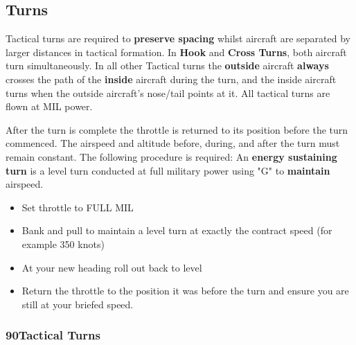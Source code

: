 \newpage

\subsection{Turns}

Tactical turns are required to \textbf{preserve spacing} whilst aircraft are
separated by larger distances in tactical formation. In \textbf{Hook} and
\textbf{Cross Turns}, both aircraft turn simultaneously. In all other Tactical
turns the \textbf{outside} aircraft \textbf{always} crosses the path of the
\textbf{inside} aircraft during the turn, and the inside aircraft turns when
the outside aircraft's nose/tail points at it. All tactical turns are flown at
MIL power.

After the turn is complete the throttle is returned to its position before the
turn commenced. The airspeed and altitude before, during, and after the turn
must remain constant. The following procedure is required: An \textbf{energy
sustaining turn} is a level turn conducted at full military power using "G" to
\textbf{maintain} airspeed.

\begin{itemize}

  \item Set throttle to FULL MIL

  \item Bank and pull to maintain a level turn at exactly the contract speed
    (for example 350 knots)

  \item At your new heading roll out back to level

  \item Return the throttle to the position it was before the turn and ensure
    you are still at your briefed speed.

\end{itemize}


\subsubsection{90\textdegree Tactical Turns}


